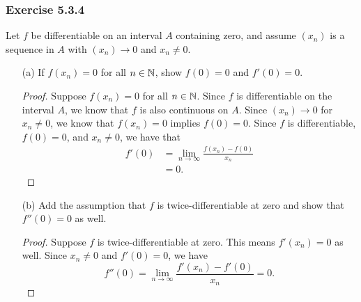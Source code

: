 \subsubsection{Exercise 5.3.4} Let \( f  \) be differentiable on an interval \( A  \) containing zero, and assume \( (x_n)  \) is a sequence in \( A  \) with \( (x_n) \to 0  \) and \( x_n \neq 0 \).

\begin{enumerate}
    \item[(a)] If \( f(x_n) = 0  \) for all \( n \in \mathbb{N}  \), show \( f(0) = 0  \) and \( f'(0) = 0  \). 
        \begin{proof}
            Suppose \( f(x_n) = 0  \) for all \( n \in \mathbb{N}  \). Since \( f  \) is differentiable on the interval \( A  \), we know that \( f  \) is also continuous on \( A  \). Since \( (x_n) \to 0  \) for \( x_n \neq 0  \), we know that \( f(x_n) = 0  \) implies \( f(0) = 0  \). Since \( f  \) is differentiable, \( f(0) = 0  \), and \( x_n \neq 0  \), we have that
            \begin{align*}
                f'(0) &= \lim_{ n \to \infty  } \frac{ f(x_n) - f(0)  }{ x_n  }  \\
                      &= 0. 
            \end{align*}
        \end{proof}
    \item[(b)] Add the assumption that \( f  \) is twice-differentiable at zero and show that \( f''(0) = 0  \) as well.
        \begin{proof}
        Suppose \( f  \) is twice-differentiable at zero. This means \( f'(x_n) = 0  \) as well. Since \( x_n \neq 0  \) and \( f'(0) = 0  \), we have
        \[  f''(0) = \lim_{n  \to \infty  } \frac{ f'(x_n) - f'(0) }{ x_n } = 0.   \]
        \end{proof}
\end{enumerate}

